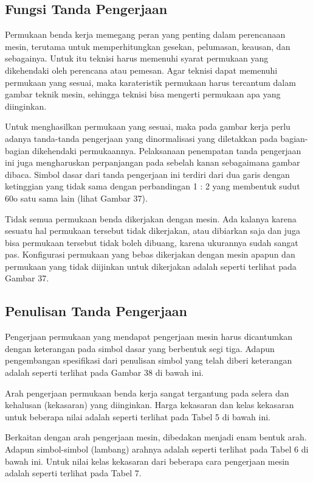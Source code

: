 \documentclass[11pt]{simart} %
\begin{document}
\subsection{Fungsi Tanda Pengerjaan}
Permukaan benda kerja memegang peran yang penting dalam perencanaan mesin, terutama untuk memperhitungkan gesekan, pelumasan, keausan, dan sebagainya. Untuk itu teknisi harus memenuhi syarat permukaan yang dikehendaki oleh perencana atau pemesan. Agar teknisi dapat memenuhi permukaan yang sesuai, maka karateristik permukaan harus tercantum dalam gambar teknik mesin, sehingga teknisi bisa mengerti permukaan apa yang diinginkan.

Untuk menghasilkan permukaan yang sesuai, maka pada gambar kerja perlu adanya tanda-tanda pengerjaan yang dinormalisasi yang diletakkan pada bagian-bagian dikehendaki permukaannya. Pelaksanaan penempatan tanda pengerjaan ini juga mengharuskan perpanjangan pada sebelah kanan sebagaimana gambar dibaca. Simbol dasar dari tanda pengerjaan ini terdiri dari dua garis dengan ketinggian yang tidak sama dengan perbandingan 1 : 2 yang membentuk sudut 60o satu sama lain (lihat Gambar 37).

Tidak semua permukaan benda dikerjakan dengan mesin. Ada kalanya karena sesuatu hal permukaan tersebut tidak dikerjakan, atau dibiarkan saja dan juga bisa permukaan tersebut tidak boleh dibuang, karena ukurannya sudah sangat pas. Konfigurasi permukaan yang bebas dikerjakan dengan mesin apapun dan permukaan yang tidak diijinkan untuk dikerjakan adalah seperti terlihat pada Gambar 37.

\subsection{Penulisan Tanda Pengerjaan}
Pengerjaan permukaan yang mendapat pengerjaan mesin harus dicantumkan dengan keterangan pada simbol dasar yang berbentuk segi tiga. Adapun pengembangan spesifikasi dari penulisan simbol yang telah diberi keterangan adalah seperti terlihat pada Gambar 38 di bawah ini.

Arah pengerjaan permukaan benda kerja sangat tergantung pada selera dan kehalusan (kekasaran) yang diinginkan. Harga kekasaran dan kelas kekasaran untuk beberapa nilai adalah seperti terlihat pada Tabel 5 di bawah ini.

Berkaitan dengan arah pengerjaan mesin, dibedakan menjadi enam bentuk arah. Adapun simbol-simbol (lambang) arahnya adalah seperti terlihat pada Tabel 6 di bawah ini. Untuk nilai kelas kekasaran dari beberapa cara pengerjaan mesin adalah seperti terlihat pada Tabel 7.
\end{document}

